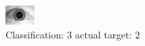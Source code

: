 \begin{figure}[h!]
\begin{center}
\includegraphics[width=0.60\columnwidth]{figures/ID1778_class_3_target_2.png}
\end{center}
\caption{ Classification: 3 actual target: 2}
\label{fig:ID1778_class_3_target_2}
\end{figure}
